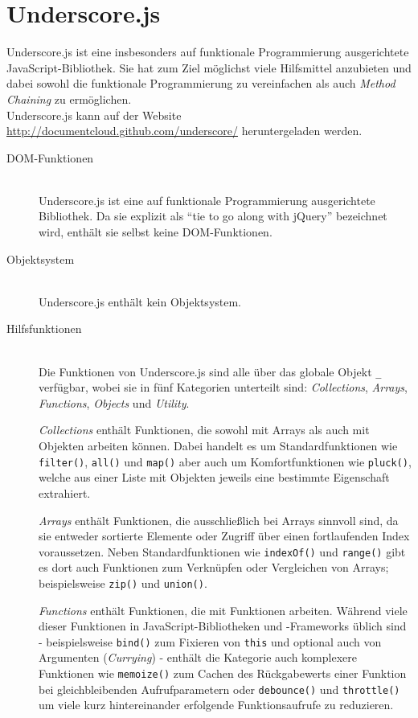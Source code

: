 \section{Underscore.js}
Underscore.js ist eine insbesonders auf funktionale Programmierung ausgerichtete
JavaScript-Bibliothek. Sie hat zum Ziel möglichst viele Hilfsmittel anzubieten und dabei sowohl die
funktionale  Programmierung zu vereinfachen als auch \emph{Method Chaining} zu ermöglichen. \\
Underscore.js kann auf der Website
\href{http://documentcloud.github.com/underscore/}{http://documentcloud.github.com/underscore/}
heruntergeladen werden.

\begin{description}
\item[DOM-Funktionen] \hfill \\
Underscore.js ist eine auf funktionale Programmierung ausgerichtete Bibliothek. Da sie explizit als
\enquote{tie to go along with jQuery} bezeichnet wird, enthält sie selbst keine DOM-Funktionen.

\item[Objektsystem] \hfill \\
Underscore.js enthält kein Objektsystem.

\item[Hilfsfunktionen] \hfill \\
Die Funktionen von Underscore.js sind alle über das globale Objekt \lstinline{_} verfügbar, wobei
sie in fünf Kategorien unterteilt sind: \emph{Collections}, \emph{Arrays}, \emph{Functions},
\emph{Objects} und \emph{Utility}.

\emph{Collections} enthält Funktionen, die sowohl mit Arrays als auch mit Objekten arbeiten können.
Dabei handelt es um Standardfunktionen wie \lstinline{filter()}, \lstinline{all()} und
\lstinline{map()} aber auch um Komfortfunktionen wie \lstinline{pluck()}, welche aus einer Liste mit
Objekten jeweils eine bestimmte Eigenschaft extrahiert.

\emph{Arrays} enthält Funktionen, die ausschließlich bei Arrays sinnvoll sind, da sie entweder
sortierte Elemente oder Zugriff über einen fortlaufenden Index voraussetzen. Neben
Standardfunktionen wie \lstinline{indexOf()} und \lstinline{range()} gibt es dort auch Funktionen
zum Verknüpfen oder Vergleichen von Arrays; beispielsweise \lstinline{zip()} und
\lstinline{union()}.

\emph{Functions} enthält Funktionen, die mit Funktionen arbeiten. Während viele dieser Funktionen in
JavaScript-Bibliotheken und -Frameworks üblich sind - beispielsweise \lstinline{bind()} zum Fixieren
von \lstinline{this} und optional auch von Argumenten (\emph{Currying}) - enthält die Kategorie auch
komplexere Funktionen wie \lstinline{memoize()} zum Cachen des Rückgabewerts einer Funktion bei
gleichbleibenden Aufrufparametern oder \lstinline{debounce()} und \lstinline{throttle()} um viele
kurz hintereinander erfolgende Funktionsaufrufe zu reduzieren.


\end{description}
